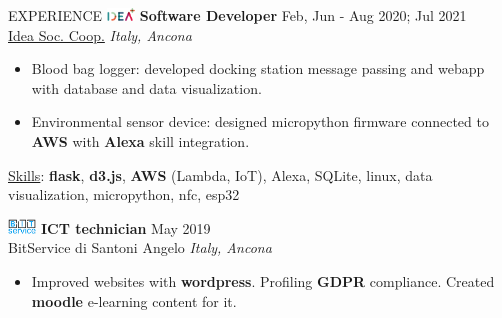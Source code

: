 \documentclass{resume} %
\def\intraexpvspace{0.15cm}
\def\titlelistvspace{-0.15cm}
\begin{document}
\begin{rSection}{EXPERIENCE}
    \includegraphics[width=0.75cm, trim={0cm 1.5cm 0cm 0cm}]{idea-icon.png}
    \textbf{Software Developer} \hfill Feb, Jun - Aug 2020; Jul 2021\\
    \hspace*{0.85cm}\href{https://idea-on-line.it/}{Idea Soc. Coop.} \hfill \textit{Italy, Ancona}
    \vspace{\titlelistvspace}\begin{itemize}
        \itemsep -3pt {}
        \item Blood bag logger: developed docking station message passing and webapp with database and data visualization.
        \item Environmental sensor device: designed micropython firmware
              connected to \textbf{AWS}
              with \textbf{Alexa} skill integration.
    \end{itemize}
    \vspace*{-0.1cm}\hspace*{0.5cm}\underline{Skills}:
    \textbf{flask},
    \textbf{d3.js},
    \textbf{AWS} (Lambda, IoT),
    Alexa,
    SQLite,
    linux,
    data visualization,
    micropython,
    nfc,
    esp32
    \vspace{\intraexpvspace}

    \includegraphics[width=0.75cm, trim={0cm 1.5cm 0cm 0cm}]{bitservice-icon.png}
    \textbf{ICT technician} \hfill May 2019 \\
    \hspace*{0.85cm}BitService di Santoni Angelo \hfill \textit{Italy, Ancona}
    \vspace{\titlelistvspace}\begin{itemize}
        \itemsep -3pt {}
        \item Improved websites with \textbf{wordpress}.
              Profiling \textbf{GDPR} compliance.
              Created \textbf{moodle} e-learning content for it. %
    \end{itemize}

\end{rSection}
\end{document}
